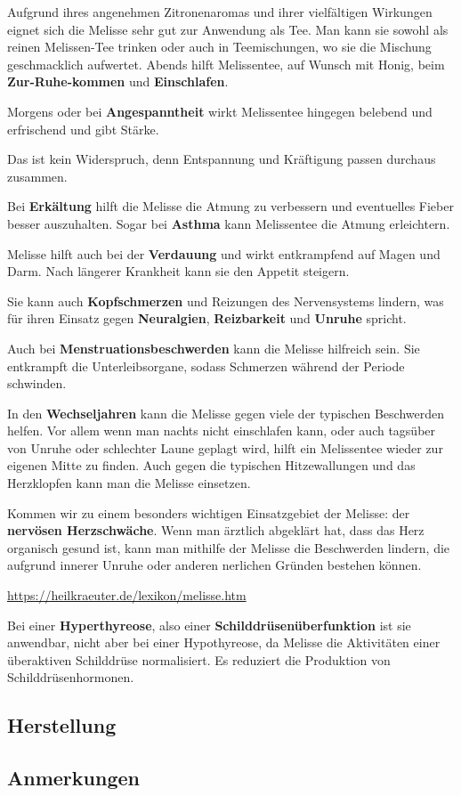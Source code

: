 Aufgrund ihres angenehmen Zitronenaromas und ihrer vielfältigen Wirkungen eignet sich die Melisse sehr gut zur Anwendung als Tee. Man kann sie sowohl als reinen Melissen-Tee trinken oder auch in Teemischungen, wo sie die Mischung geschmacklich aufwertet.
Abends hilft Melissentee, auf Wunsch mit Honig, beim \textbf{Zur-Ruhe-kommen} und \textbf{Einschlafen}.

Morgens oder bei \textbf{Angespanntheit} wirkt Melissentee hingegen belebend und erfrischend und gibt Stärke.

Das ist kein Widerspruch, denn Entspannung und Kräftigung passen durchaus zusammen.

Bei \textbf{Erkältung} hilft die Melisse die Atmung zu verbessern und eventuelles Fieber besser auszuhalten. Sogar bei \textbf{Asthma} kann Melissentee die Atmung erleichtern.

Melisse hilft auch bei der \textbf{Verdauung} und wirkt entkrampfend auf Magen und Darm. Nach längerer Krankheit kann sie den Appetit steigern.

Sie kann auch \textbf{Kopfschmerzen} und Reizungen des Nervensystems lindern, was für ihren Einsatz gegen \textbf{Neuralgien}, \textbf{Reizbarkeit} und \textbf{Unruhe} spricht.

Auch bei \textbf{Menstruationsbeschwerden} kann die Melisse hilfreich sein. Sie entkrampft die Unterleibsorgane, sodass Schmerzen während der Periode schwinden.

In den \textbf{Wechseljahren} kann die Melisse gegen viele der typischen Beschwerden helfen. Vor allem wenn man nachts nicht einschlafen kann, oder auch tagsüber von Unruhe oder schlechter Laune geplagt wird, hilft ein Melissentee wieder zur eigenen Mitte zu finden. Auch gegen die typischen Hitzewallungen und das Herzklopfen kann man die Melisse einsetzen.

Kommen wir zu einem besonders wichtigen Einsatzgebiet der Melisse: der \textbf{nervösen Herzschwäche}. Wenn man ärztlich abgeklärt hat, dass das Herz organisch gesund ist, kann man mithilfe der Melisse die Beschwerden lindern, die aufgrund innerer Unruhe oder anderen nerlichen Gründen bestehen können.

\cite{heilkraeuterlexikon}  \url{https://heilkraeuter.de/lexikon/melisse.htm}

Bei einer \textbf{Hyperthyreose}, also einer \textbf{Schilddrüsenüberfunktion} ist sie anwendbar, nicht aber bei einer Hypothyreose, da Melisse die Aktivitäten einer überaktiven Schilddrüse normalisiert. Es reduziert die Produktion von Schilddrüsenhormonen.

\subsection{Herstellung}

\subsection{Anmerkungen}
